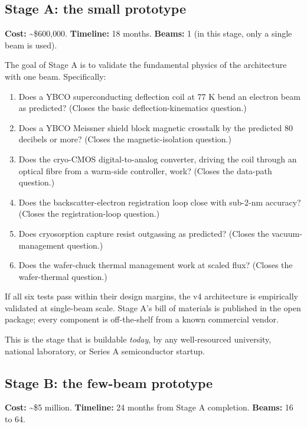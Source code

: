 \documentclass[11pt,letterpaper]{article}
\begin{document}
\subsection{Stage A: the small prototype}

\textbf{Cost:} \textasciitilde\$600{,}000. \textbf{Timeline:} 18 months. \textbf{Beams:} 1 (in this stage, only a single beam is used).

The goal of Stage A is to validate the fundamental physics of the architecture with one beam. Specifically:

\begin{enumerate}[leftmargin=1.6em]
  \item Does a YBCO superconducting deflection coil at 77 K bend an electron beam as predicted? (Closes the basic deflection-kinematics question.)
  \item Does a YBCO Meissner shield block magnetic crosstalk by the predicted 80 decibels or more? (Closes the magnetic-isolation question.)
  \item Does the cryo-CMOS digital-to-analog converter, driving the coil through an optical fibre from a warm-side controller, work? (Closes the data-path question.)
  \item Does the backscatter-electron registration loop close with sub-2-nm accuracy? (Closes the registration-loop question.)
  \item Does cryosorption capture resist outgassing as predicted? (Closes the vacuum-management question.)
  \item Does the wafer-chuck thermal management work at scaled flux? (Closes the wafer-thermal question.)
\end{enumerate}

If all six tests pass within their design margins, the v4 architecture is empirically validated at single-beam scale. Stage A's bill of materials is published in the open package; every component is off-the-shelf from a known commercial vendor.

This is the stage that is buildable \emph{today}, by any well-resourced university, national laboratory, or Series A semiconductor startup.

\subsection{Stage B: the few-beam prototype}

\textbf{Cost:} \textasciitilde\$5 million. \textbf{Timeline:} 24 months from Stage A completion. \textbf{Beams:} 16 to 64.
\end{document}
